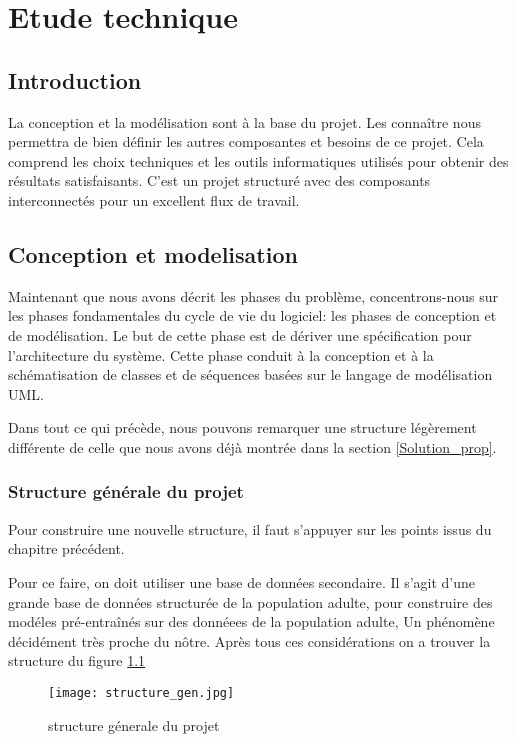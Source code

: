 \chapter{Etude technique}

\section*{Introduction}
La conception et la modélisation sont à la base du projet. Les connaître nous permettra de bien définir les autres composantes et besoins de ce projet. Cela comprend les choix techniques et les outils informatiques utilisés pour obtenir des résultats satisfaisants. C'est un projet  structuré avec des composants interconnectés pour un excellent flux de travail.

\section{Conception et modelisation}
Maintenant que nous avons décrit les phases du problème, concentrons-nous sur les phases fondamentales du cycle de vie du logiciel: les phases de conception et de modélisation. Le but de cette phase est de dériver une spécification pour l'architecture du système. 
Cette phase conduit à la conception et à la schématisation de classes et de séquences basées sur le langage de modélisation UML.

Dans tout ce qui précède, nous pouvons remarquer une structure légèrement différente de celle que nous avons déjà montrée dans la section \ref{Solution_prop}.
    \subsection{Structure générale du projet}
    Pour construire une nouvelle structure, il faut s'appuyer sur les points issus du chapitre précédent.

    Pour ce faire, on doit utiliser une base de données secondaire. Il s'agit d'une grande base de données structurée de la population adulte, pour construire des modéles pré-entraînés sur des donnéees de la population adulte, Un phénomène décidément très proche du nôtre.
    Après tous ces considérations on a trouver la structure du figure \ref{fig:structure_gen}
    \begin{figure}[H]
        \centering
        \texttt{[image: structure\_gen.jpg]}
        \caption{structure génerale du projet}\label{fig:structure_gen}
    \end{figure}
